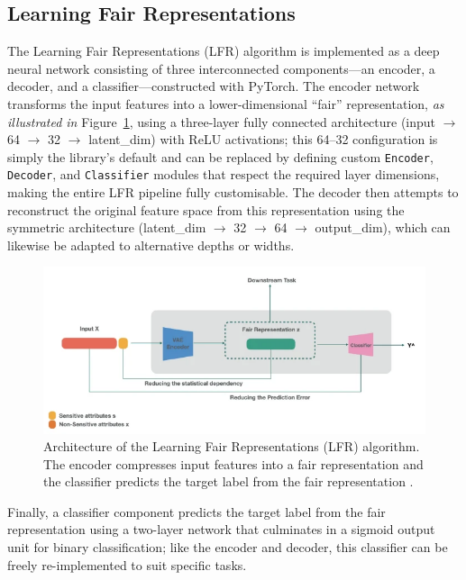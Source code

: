 \documentclass[12pt,a4paper,openright,twoside]{book}
\begin{document}
\subsection{Learning Fair Representations}
The Learning Fair Representations (LFR) algorithm is implemented as a deep neural network consisting of three interconnected components—an encoder, a decoder, and a classifier—constructed with PyTorch. The encoder network transforms the input features into a lower-dimensional “fair” representation, \textit{as illustrated in} Figure~\ref{fig:lfr_architecture}, using a three-layer fully connected architecture (input $\rightarrow$ 64 $\rightarrow$ 32 $\rightarrow$ latent\_dim) with ReLU activations; this 64–32 configuration is simply the library’s default and can be replaced by defining custom \texttt{Encoder}, \texttt{Decoder}, and \texttt{Classifier} modules that respect the required layer dimensions, making the entire LFR pipeline fully customisable. The decoder then attempts to reconstruct the original feature space from this representation using the symmetric architecture (latent\_dim $\rightarrow$ 32 $\rightarrow$ 64 $\rightarrow$ output\_dim), which can likewise be adapted to alternative depths or widths. 

\begin{figure}
\centering
\includegraphics[width=\textwidth]{figures/lfr_architecture.png}
\caption{Architecture of the Learning Fair Representations (LFR) algorithm. The encoder compresses input features into a fair representation and the classifier predicts the target label from the fair representation \cite{TayebiAidaLfr}.}
\label{fig:lfr_architecture}
\end{figure}

Finally, a classifier component predicts the target label from the fair representation using a two-layer network that culminates in a sigmoid output unit for binary classification; like the encoder and decoder, this classifier can be freely re-implemented to suit specific tasks.
\end{document}
